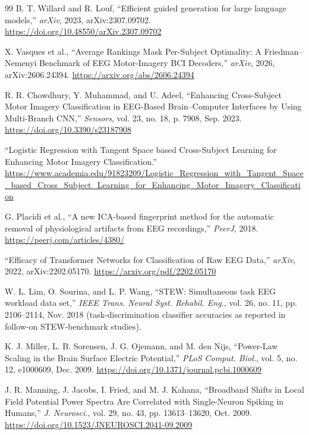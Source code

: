 \documentclass[11pt]{article}
\begin{document}
\begin{thebibliography}{99}
 B. T. Willard and R. Louf, ``Efficient guided generation for large language models,'' \emph{arXiv}, 2023, arXiv:2307.09702. \url{https://doi.org/10.48550/arXiv.2307.09702}

 X. Vasques et al., ``Average Rankings Mask Per-Subject Optimality: A Friedman--Nemenyi Benchmark of EEG Motor-Imagery BCI Decoders,'' \emph{arXiv}, 2026, arXiv:2606.24394. \url{https://arxiv.org/abs/2606.24394}

 R. R. Chowdhury, Y. Muhammad, and U. Adeel, ``Enhancing Cross-Subject Motor Imagery Classification in EEG-Based Brain--Computer Interfaces by Using Multi-Branch CNN,'' \emph{Sensors}, vol. 23, no. 18, p. 7908, Sep. 2023. \url{https://doi.org/10.3390/s23187908}

 ``Logistic Regression with Tangent Space based Cross-Subject Learning for Enhancing Motor Imagery Classification.'' \url{https://www.academia.edu/91823209/Logistic_Regression_with_Tangent_Space_based_Cross_Subject_Learning_for_Enhancing_Motor_Imagery_Classification}

 G. Placidi et al., ``A new ICA-based fingerprint method for the automatic removal of physiological artifacts from EEG recordings,'' \emph{PeerJ}, 2018. \url{https://peerj.com/articles/4380/}

 ``Efficacy of Transformer Networks for Classification of Raw EEG Data,'' \emph{arXiv}, 2022, arXiv:2202.05170. \url{https://arxiv.org/pdf/2202.05170}

 W. L. Lim, O. Sourina, and L. P. Wang, ``STEW: Simultaneous task EEG workload data set,'' \emph{IEEE Trans. Neural Syst. Rehabil. Eng.}, vol. 26, no. 11, pp. 2106--2114, Nov. 2018 (task-discrimination classifier accuracies as reported in follow-on STEW-benchmark studies).

 K. J. Miller, L. B. Sorensen, J. G. Ojemann, and M. den Nijs, ``Power-Law Scaling in the Brain Surface Electric Potential,'' \emph{PLoS Comput. Biol.}, vol. 5, no. 12, e1000609, Dec. 2009. \url{https://doi.org/10.1371/journal.pcbi.1000609}

 J. R. Manning, J. Jacobs, I. Fried, and M. J. Kahana, ``Broadband Shifts in Local Field Potential Power Spectra Are Correlated with Single-Neuron Spiking in Humans,'' \emph{J. Neurosci.}, vol. 29, no. 43, pp. 13613--13620, Oct. 2009. \url{https://doi.org/10.1523/JNEUROSCI.2041-09.2009}


\end{thebibliography}
\end{document}
